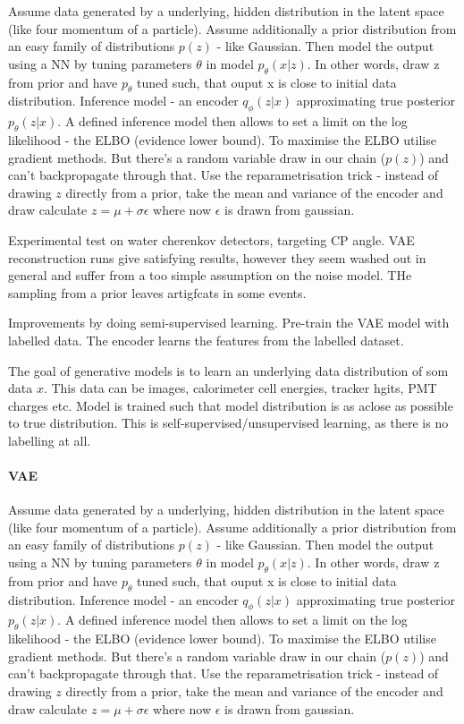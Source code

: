   Assume data generated by a underlying, hidden distribution in the latent space
(like four momentum of a particle). Assume additionally a prior distribution
from an easy family of distributions $p(z)$ - like Gaussian. Then model the
output using a NN by tuning parameters $\theta$ in model $p_\theta(x|z)$. In
other words, draw z from prior and have $p_\theta$ tuned such, that ouput x is
close to initial data distribution. Inference model - an encoder $q_\phi(z|x)$
approximating true posterior $p_\theta(z|x)$. A defined inference model then
allows to set a limit on the log likelihood - the ELBO (evidence lower bound).
To maximise the ELBO utilise gradient methods. But there's a random variable
draw in our chain ($p(z)$) and can't backpropagate through that. Use the
reparametrisation trick - instead of drawing $z$ directly from a prior, take the
mean and variance of the encoder and draw calculate $z=\mu+\sigma\epsilon$ where
now $\epsilon$ is drawn from gaussian.

Experimental test on water cherenkov detectors, targeting CP angle. VAE
reconstruction runs give satisfying results, however they seem washed out in
general and suffer from a too simple assumption on the noise model. THe sampling
from a prior leaves artigfcats in some events.

Improvements by doing semi-supervised learning. Pre-train the VAE model with
labelled data. The encoder learns the features from the labelled dataset.

The goal of generative models is to learn an underlying data distribution of som
data $x$. This data can be images, calorimeter cell energies, tracker hgits, PMT
charges etc. Model is trained such that model distribution is as aclose as
possible to true distribution. This is self-supervised/unsupervised learning, as
there is no labelling at all.
\paragraph{VAE}
Assume data generated by a underlying, hidden distribution in the latent space
(like four momentum of a particle). Assume additionally a prior distribution
from an easy family of distributions $p(z)$ - like Gaussian. Then model the
output using a NN by tuning parameters $\theta$ in model $p_\theta(x|z)$. In
other words, draw z from prior and have $p_\theta$ tuned such, that ouput x is
close to initial data distribution. Inference model - an encoder $q_\phi(z|x)$
approximating true posterior $p_\theta(z|x)$. A defined inference model then
allows to set a limit on the log likelihood - the ELBO (evidence lower bound).
To maximise the ELBO utilise gradient methods. But there's a random variable
draw in our chain ($p(z)$) and can't backpropagate through that. Use the
reparametrisation trick - instead of drawing $z$ directly from a prior, take the
mean and variance of the encoder and draw calculate $z=\mu+\sigma\epsilon$ where
now $\epsilon$ is drawn from gaussian.

